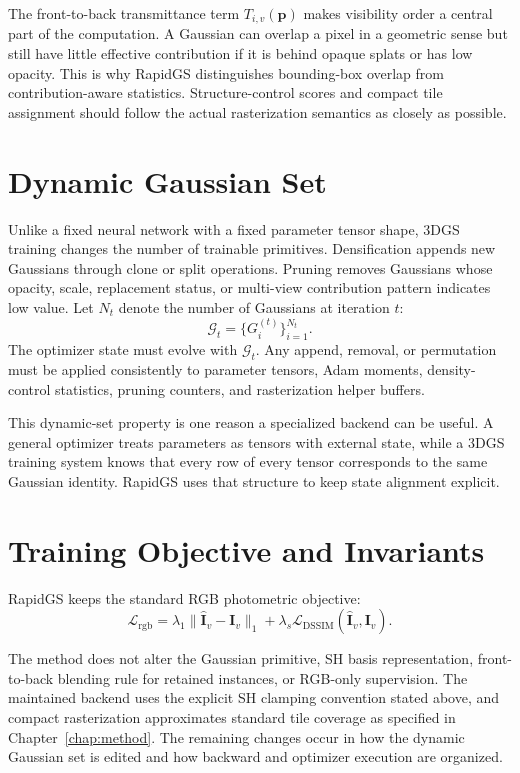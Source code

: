 The front-to-back transmittance term $T_{i,v}(\mathbf{p})$ makes visibility order a central part of the computation. A Gaussian can overlap a pixel in a geometric sense but still have little effective contribution if it is behind opaque splats or has low opacity. This is why RapidGS distinguishes bounding-box overlap from contribution-aware statistics. Structure-control scores and compact tile assignment should follow the actual rasterization semantics as closely as possible.

\section{Dynamic Gaussian Set}

Unlike a fixed neural network with a fixed parameter tensor shape, 3DGS training changes the number of trainable primitives. Densification appends new Gaussians through clone or split operations. Pruning removes Gaussians whose opacity, scale, replacement status, or multi-view contribution pattern indicates low value. Let $N_t$ denote the number of Gaussians at iteration $t$:
\begin{equation}
\mathcal{G}_t=\{G_i^{(t)}\}_{i=1}^{N_t}.
\end{equation}
The optimizer state must evolve with $\mathcal{G}_t$. Any append, removal, or permutation must be applied consistently to parameter tensors, Adam moments, density-control statistics, pruning counters, and rasterization helper buffers.

This dynamic-set property is one reason a specialized backend can be useful. A general optimizer treats parameters as tensors with external state, while a 3DGS training system knows that every row of every tensor corresponds to the same Gaussian identity. RapidGS uses that structure to keep state alignment explicit.

\section{Training Objective and Invariants}

RapidGS keeps the standard RGB photometric objective:
\begin{equation}
\mathcal{L}_{\mathrm{rgb}}
=
\lambda_1
\|\hat{\mathbf{I}}_v-\mathbf{I}_v\|_1
+
\lambda_s
\mathcal{L}_{\mathrm{DSSIM}}
(\hat{\mathbf{I}}_v,\mathbf{I}_v).
\end{equation}

The method does not alter the Gaussian primitive, SH basis representation, front-to-back blending rule for retained instances, or RGB-only supervision. The maintained backend uses the explicit SH clamping convention stated above, and compact rasterization approximates standard tile coverage as specified in Chapter~\ref{chap:method}. The remaining changes occur in how the dynamic Gaussian set is edited and how backward and optimizer execution are organized.

